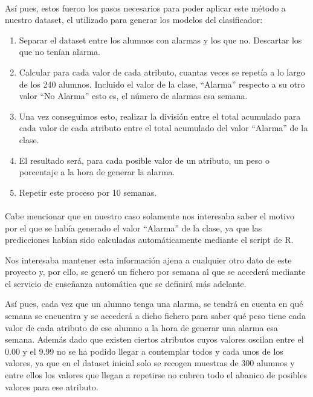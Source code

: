 \paragraph{}
Así pues, estos fueron los pasos necesarios para poder aplicar este
método a nuestro dataset, el utilizado para generar los modelos del
clasificador:
\begin{enumerate}
\item Separar el dataset entre los alumnos con alarmas y los que
  no. Descartar los que no tenían alarma.
\item Calcular para cada valor de cada atributo, cuantas veces se
  repetía a lo largo de los 240 alumnos. Incluido el valor de la
  clase, “Alarma” respecto a su otro valor “No Alarma” esto es, el
  número de alarmas esa semana.
\item Una vez conseguimos esto, realizar la división entre el total
  acumulado para cada valor de cada atributo entre el total acumulado
  del valor “Alarma” de la clase.
\item El resultado será, para cada posible valor de un atributo, un
  peso o porcentaje a la hora de generar la alarma.
\item Repetir este proceso por 10 semanas.
\end{enumerate}

\paragraph{}
Cabe mencionar que en nuestro caso solamente nos interesaba saber el
motivo por el que se había generado el valor “Alarma” de la clase, ya
que las predicciones habían sido calculadas automáticamente mediante
el script de R.

Nos interesaba mantener esta información ajena a cualquier otro dato
de este proyecto y, por ello, se generó un fichero por semana al que
se accederá mediante el servicio de enseñanza automática que se
definirá más adelante.

Así pues, cada vez que un alumno tenga una alarma, se tendrá en cuenta
en qué semana se encuentra y se accederá a dicho fichero para saber
qué peso tiene cada valor de cada atributo de ese alumno a la hora de
generar una alarma esa semana. Además dado que existen ciertos
atributos cuyos valores oscilan entre el 0.00 y el 9.99 no se ha
podido llegar a contemplar todos y cada unos de los valores, ya que en
el dataset inicial solo se recogen muestras de 300 alumnos y entre
ellos los valores que llegan a repetirse no cubren todo el abanico de
posibles valores para ese atributo.

